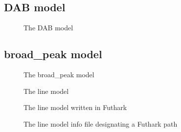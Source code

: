 \documentclass[11pt]{article}
\begin{document}
\subsection*{DAB model}
\begin{figure}
  
  \label{fig:dab}
  \caption{The DAB model}
\end{figure}

\subsection*{broad\_peak model}
\begin{figure}
  
  \caption{The broad_peak model}
\end{figure}

\begin{figure}
  
  \caption{The line model}
\end{figure}

\begin{figure}
  
  \label{fig:linemodel-futhark}
  \caption{The line model written in Futhark}
\end{figure}

\begin{figure}
  
  \caption{The line model info file designating a Futhark path}
\end{figure}
\end{document}
